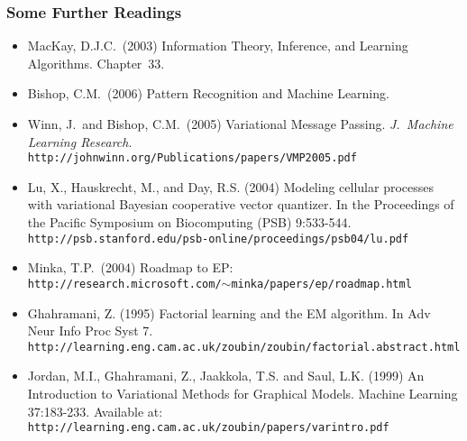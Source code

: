 \begin{frame}
\frametitle{Some Further Readings}

{\small 
\begin{itemize}
\item MacKay, D.J.C.\ (2003) Information Theory, Inference, and
Learning Algorithms. Chapter~33.
\item Bishop, C.M.\ (2006) Pattern Recognition and Machine Learning. 
\item Winn, J.\ and Bishop, C.M.\ (2005) Variational Message Passing. 
{\em J.\ Machine Learning
  Research}. {\tt http://johnwinn.org/Publications/papers/VMP2005.pdf}
\item Lu, X., Hauskrecht, M., and Day, R.S. (2004) Modeling cellular processes with
variational Bayesian cooperative vector quantizer. In the Proceedings
of the Pacific Symposium on Biocomputing (PSB) 9:533-544.
{\tt http://psb.stanford.edu/psb-online/proceedings/psb04/lu.pdf}
\item Minka, T.P.\ (2004) Roadmap to EP: \\
{\tt http://research.microsoft.com/$\sim$minka/papers/ep/roadmap.html}
\item Ghahramani, Z. (1995) Factorial learning and the EM algorithm.
In Adv Neur Info Proc Syst 7. \\
{\tt http://learning.eng.cam.ac.uk/zoubin/zoubin/factorial.abstract.html}
\item Jordan, M.I., Ghahramani, Z., Jaakkola, T.S. and Saul, L.K. (1999) 
     An Introduction to Variational Methods for Graphical Models.
Machine Learning 37:183-233. Available at:
{\tt http://learning.eng.cam.ac.uk/zoubin/papers/varintro.pdf}
\end{itemize}
}
\end{frame}
